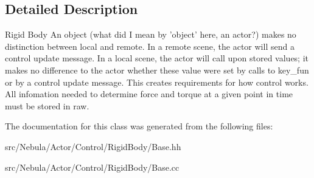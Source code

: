 \subsection{\-Detailed \-Description}
\-Rigid \-Body \-An object (what did \-I mean by 'object' here, an actor?) makes no distinction between local and remote. \-In a remote scene, the actor will send a control update message. \-In a local scene, the actor will call upon stored values; it makes no difference to the actor whether these value were set by calls to key\-\_\-fun or by a control update message. \-This creates requirements for how control works. \-All infomation needed to determine force and torque at a given point in time must be stored in raw. 

\-The documentation for this class was generated from the following files\-:\begin{DoxyCompactItemize}
\item 
src/\-Nebula/\-Actor/\-Control/\-Rigid\-Body/\-Base.\-hh\item 
src/\-Nebula/\-Actor/\-Control/\-Rigid\-Body/\-Base.\-cc\end{DoxyCompactItemize}
